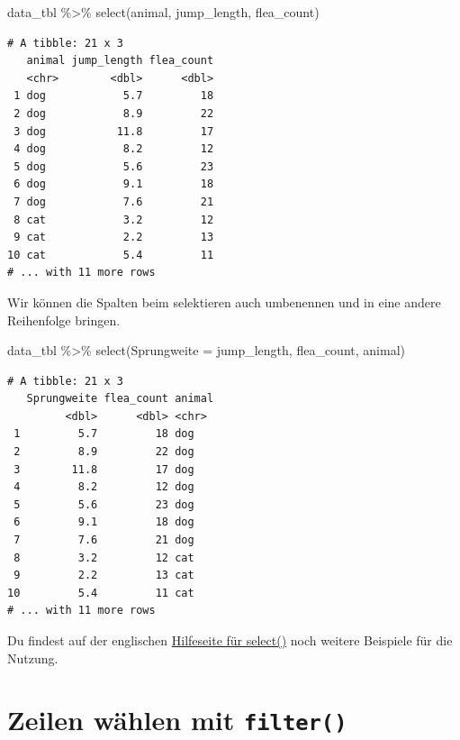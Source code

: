 \documentclass[
  letterpaper,
  DIV=11,
  oneside]{scrreport}
\newenvironment{Shaded}{\begin{snugshade}}{\end{snugshade}}
\newcommand{\AttributeTok}[1]{\textcolor[rgb]{0.40,0.45,0.13}{#1}}
\newcommand{\FunctionTok}[1]{\textcolor[rgb]{0.28,0.35,0.67}{#1}}
\newcommand{\NormalTok}[1]{\textcolor[rgb]{0.00,0.23,0.31}{#1}}
\newcommand{\SpecialCharTok}[1]{\textcolor[rgb]{0.37,0.37,0.37}{#1}}
\begin{document}
\begin{Shaded}
\begin{Highlighting}[]
\NormalTok{data\_tbl }\SpecialCharTok{\%\textgreater{}\%} 
  \FunctionTok{select}\NormalTok{(animal, jump\_length, flea\_count)}
\end{Highlighting}
\end{Shaded}

\begin{verbatim}
# A tibble: 21 x 3
   animal jump_length flea_count
   <chr>        <dbl>      <dbl>
 1 dog            5.7         18
 2 dog            8.9         22
 3 dog           11.8         17
 4 dog            8.2         12
 5 dog            5.6         23
 6 dog            9.1         18
 7 dog            7.6         21
 8 cat            3.2         12
 9 cat            2.2         13
10 cat            5.4         11
# ... with 11 more rows
\end{verbatim}

Wir können die Spalten beim selektieren auch umbenennen und in eine
andere Reihenfolge bringen.

\begin{Shaded}
\begin{Highlighting}[]
\NormalTok{data\_tbl }\SpecialCharTok{\%\textgreater{}\%} 
  \FunctionTok{select}\NormalTok{(}\AttributeTok{Sprungweite =}\NormalTok{ jump\_length, flea\_count, animal)}
\end{Highlighting}
\end{Shaded}

\begin{verbatim}
# A tibble: 21 x 3
   Sprungweite flea_count animal
         <dbl>      <dbl> <chr> 
 1         5.7         18 dog   
 2         8.9         22 dog   
 3        11.8         17 dog   
 4         8.2         12 dog   
 5         5.6         23 dog   
 6         9.1         18 dog   
 7         7.6         21 dog   
 8         3.2         12 cat   
 9         2.2         13 cat   
10         5.4         11 cat   
# ... with 11 more rows
\end{verbatim}

Du findest auf der englischen
\href{https://dplyr.tidyverse.org/reference/select.html}{Hilfeseite für
select()} noch weitere Beispiele für die Nutzung.

\hypertarget{zeilen-wuxe4hlen-mit-filter}{%
\section{\texorpdfstring{Zeilen wählen mit
\texttt{filter()}}{Zeilen wählen mit filter()}}\label{zeilen-wuxe4hlen-mit-filter}}
\end{document}
